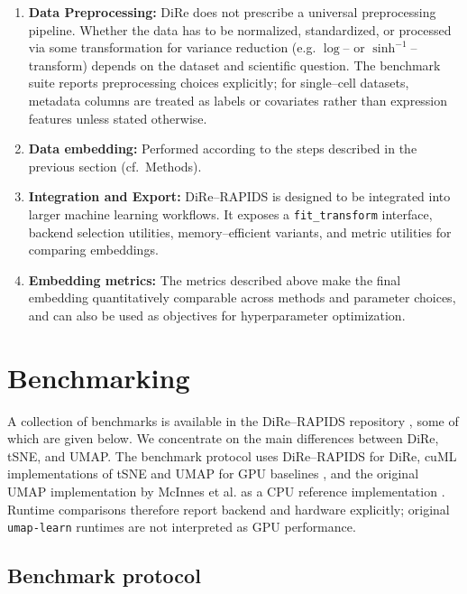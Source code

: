 \documentclass[11pt]{article}
\begin{document}
\begin{enumerate}
    \item \textbf{Data Preprocessing:} DiRe does not prescribe a universal preprocessing pipeline. Whether the data has to be normalized, standardized, or processed via some transformation for variance reduction (e.g. $\log$-- or $\sinh^{-1}$--transform) depends on the dataset and scientific question. The benchmark suite reports preprocessing choices explicitly; for single--cell datasets, metadata columns are treated as labels or covariates rather than expression features unless stated otherwise.
    
    \item \textbf{Data embedding:} Performed according to the steps described in the previous section (cf.~Methods).  
    
    \item \textbf{Integration and Export:} DiRe--RAPIDS is designed to be integrated into larger machine learning workflows. It exposes a \texttt{fit\_transform} interface, backend selection utilities, memory--efficient variants, and metric utilities for comparing embeddings. 

    \item \textbf{Embedding metrics:} The metrics described above make the final embedding quantitatively comparable across methods and parameter choices, and can also be used as objectives for hyperparameter optimization.
\end{enumerate}

\section{Benchmarking}

A collection of benchmarks is available in the DiRe--RAPIDS repository \cite{dire-rapids}, some of which are given below. We concentrate on the main differences between DiRe, tSNE, and UMAP. The benchmark protocol uses DiRe--RAPIDS for DiRe, cuML implementations of tSNE and UMAP for GPU baselines \cite{cuml}, and the original UMAP implementation by McInnes et al. as a CPU reference implementation \cite{umap-git,umap}. Runtime comparisons therefore report backend and hardware explicitly; original \texttt{umap-learn} runtimes are not interpreted as GPU performance.

\subsection{Benchmark protocol}
\end{document}
